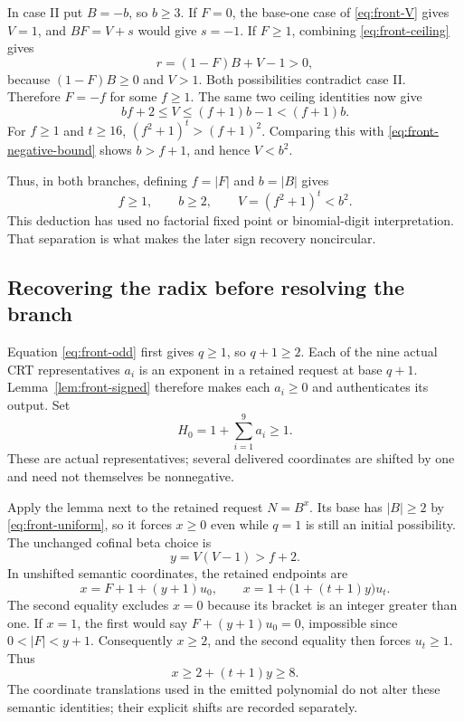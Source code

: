 In case II put $B=-b$, so $b\geq3$.  If $F=0$, the base-one case of
\eqref{eq:front-V} gives $V=1$, and $BF=V+s$ would give $s=-1$.
If $F\geq1$, combining \eqref{eq:front-ceiling} gives
\[
 r=(1-F)B+V-1>0,
\]
because $(1-F)B\geq0$ and $V>1$.  Both possibilities contradict
case II.  Therefore $F=-f$ for some $f\geq1$.  The same two ceiling
identities now give
\begin{equation}
 bf+2\leq V\leq(f+1)b-1<(f+1)b.
 \label{eq:front-negative-bound}
\end{equation}
For $f\geq1$ and $t\geq16$, $(f^2+1)^t>(f+1)^2$.
Comparing this with \eqref{eq:front-negative-bound} shows $b>f+1$,
and hence $V<b^2$.

Thus, in both branches, defining $f=|F|$ and $b=|B|$ gives
\begin{equation}
 f\geq1,\qquad b\geq2,\qquad V=(f^2+1)^t<b^2.
 \label{eq:front-uniform}
\end{equation}
This deduction has used no factorial fixed point or binomial-digit
interpretation.  That separation is what makes the later sign recovery
noncircular.

\subsection{Recovering the radix before resolving the branch}

Equation \eqref{eq:front-odd} first gives $q\geq1$, so $q+1\geq2$.
Each of the nine actual CRT representatives $a_i$ is an exponent in a
retained request at base $q+1$.  Lemma~\ref{lem:front-signed} therefore
makes each $a_i\geq0$ and authenticates its output.  Set
\[
 H_0=1+\sum_{i=1}^{9}a_i\geq1.
\]
These are actual representatives; several delivered coordinates are
shifted by one and need not themselves be nonnegative.

Apply the lemma next to the retained request $N=B^x$.  Its base has
$|B|\geq2$ by \eqref{eq:front-uniform}, so it forces $x\geq0$ even
while $q=1$ is still an initial possibility.  The unchanged cofinal beta
choice is
\[
 y=V(V-1)>f+2.
\]
In unshifted semantic coordinates, the retained endpoints are
\begin{equation}
 x=F+1+(y+1)u_0,
 \qquad
 x=1+\bigl(1+(t+1)y\bigr)u_t.
 \label{eq:front-endpoints}
\end{equation}
The second equality excludes $x=0$ because its bracket is an integer
greater than one.  If $x=1$, the first would say
$F+(y+1)u_0=0$, impossible since $0<|F|<y+1$.  Consequently $x\geq2$,
and the second equality then forces $u_t\geq1$.  Thus
\begin{equation}
 x\geq2+(t+1)y\geq8.
 \label{eq:front-x-bound}
\end{equation}
The coordinate translations used in the emitted polynomial do not alter
these semantic identities; their explicit shifts are recorded separately.

